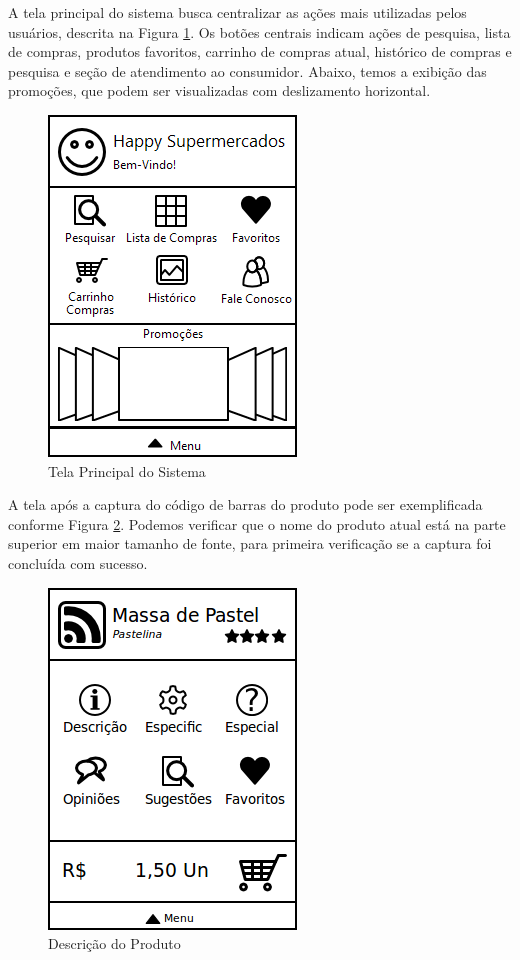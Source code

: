 \documentclass{article}
\begin{document}

A tela principal do sistema busca centralizar as ações mais utilizadas pelos
usuários, descrita na Figura \ref{fig:main}. Os botões centrais indicam ações de
pesquisa, lista de compras, produtos favoritos, carrinho de compras atual,
histórico de compras e pesquisa e seção de atendimento ao consumidor. Abaixo,
temos a exibição das promoções, que podem ser visualizadas com deslizamento
horizontal.

\begin{figure}[ht]
    \centering{}
    \includegraphics[scale=0.6]{images/main.png}
    \caption{Tela Principal do Sistema}
    \label{fig:main}
\end{figure}


A tela após a captura do código de barras do produto pode ser exemplificada
conforme Figura \ref{fig:produto}. Podemos verificar que o nome do produto atual
está na parte superior em maior tamanho de fonte, para primeira verificação se a
captura foi concluída com sucesso.

\begin{figure}[ht]
    \centering{}
    \includegraphics[scale=0.4]{images/produto.png}
    \caption{Descrição do Produto}
    \label{fig:produto}
\end{figure}
\end{document}
